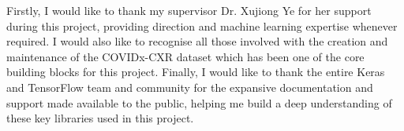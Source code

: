 \begin{acknowledgements}
Firstly, I would like to thank my supervisor Dr. Xujiong Ye for her support during this project, providing direction and machine learning expertise whenever required. I would also like to recognise all those involved with the creation and maintenance of the COVIDx-CXR dataset which has been one of the core building blocks for this project. Finally, I would like to thank the entire Keras and TensorFlow team and community for the expansive documentation and support made available to the public, helping me build a deep understanding of these key libraries used in this project.
\end{acknowledgements}